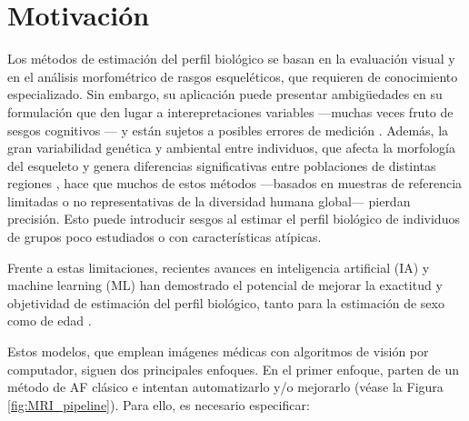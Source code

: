 

\section{Motivación}

Los métodos de estimación del perfil biológico se basan en la evaluación visual y en el análisis morfométrico de rasgos
esqueléticos, que requieren de conocimiento especializado. Sin embargo, su aplicación puede presentar ambigüedades en 
su formulación que den lugar a interepretaciones variables ---muchas veces fruto de sesgos cognitivos
\cite{nakhaeizadeh2014, cooper2019}--- y están sujetos a posibles errores de medición \cite{langley2018}.
Además, la gran variabilidad genética y ambiental entre individuos, que afecta la morfología del esqueleto y genera 
diferencias significativas entre poblaciones de distintas regiones \cite{ubelaker2017}, hace que muchos de estos métodos 
---basados en muestras de referencia limitadas o no representativas de la diversidad humana global--- pierdan precisión. 
Esto puede introducir sesgos al estimar el perfil biológico de individuos de grupos poco estudiados o con características 
atípicas.

Frente a estas limitaciones, recientes avances en inteligencia artificial (IA) y machine learning (ML) han demostrado 
el potencial de mejorar la exactitud y objetividad de estimación del perfil biológico, tanto para la estimación de sexo 
\cite{curate2017, darmawan2015, pinto2016} como de edad \cite{kim2017, larson2018, lee2017}. 

Estos modelos, que emplean imágenes médicas con algoritmos de visión por computador, siguen dos principales enfoques.
En el primer enfoque, parten de un método de AF clásico e intentan automatizarlo y/o mejorarlo 
\cite{stern2014, ajafernandez2004} (véase la Figura \ref{fig:MRI_pipeline}). 
Para ello, es necesario especificar:


